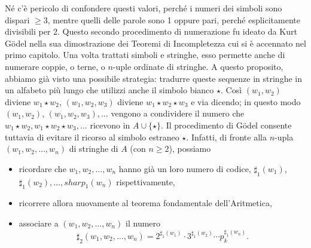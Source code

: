 \begin{enumerate}
          Né c'è pericolo di confondere questi valori, perché i numeri dei simboli
          sono dispari $\geq 3$, mentre quelli delle parole sono 1 oppure pari,
          perché esplicitamente divisibili per 2.
          Questo secondo procedimento di numerazione fu ideato da Kurt Gödel nella
          sua dimostrazione dei Teoremi di Incompletezza cui si è accennato nel
          primo capitolo.
          Una volta trattati simboli e stringhe, esso permette anche di numerare
          coppie, o terne, o $n$-uple ordinate di stringhe. A questo proposito,
          abbiamo già visto una possibile strategia: tradurre queste sequenze in
          stringhe in un alfabeto più lungo che utilizzi anche il simbolo bianco
          $\star$. Così $\left(w_1, w_2\right)$ diviene
          $w_1 \star w_2$, $\left(w_1, w_2, w_3\right)$ diviene
          $w_1 \star w_2 \star w_3$ e via dicendo; in questo modo
          $\left(w_1, w_2\right)$, $\left(w_1, w_2, w_3\right), \ldots$ vengono a
          condividere il numero che $w_1 \star w_2, w_1 \star w_2 \star w_3, \ldots$
          ricevono in $A \cup\{\star\}$.
          Il procedimento di Gödel consente tuttavia di evitare il ricorso al simbolo
          estraneo $\star$. Infatti, di fronte alla $n$-upla $(w_1, w_2, \ldots, w_n)$
          di stringhe di $A$ (con $n \ge 2$), possiamo

          \begin{itemize}
              \item ricordare che $w_1, w_2, \ldots, w_n$ hanno già un loro numero
                    di codice, $\sharp_1(w_1)$, $\sharp_1\left(w_2\right), \ldots, sharp_1\left(w_n\right)$
                    rispettivamente,
              \item ricorrere allora nuovamente al teorema fondamentale dell'Aritmetica,
              \item associare a $\left(w_1, w_2, \ldots, w_n\right)$ il numero
                    $$
                        \sharp_2\left(w_1, w_2, \ldots, w_n\right)=2^{\sharp_1\left(w_1\right)} \cdot 3^{\sharp_1\left(w_2\right)} \cdots p_k^{\sharp_1\left(w_n\right)} .
                    $$
          \end{itemize}


\end{enumerate}
